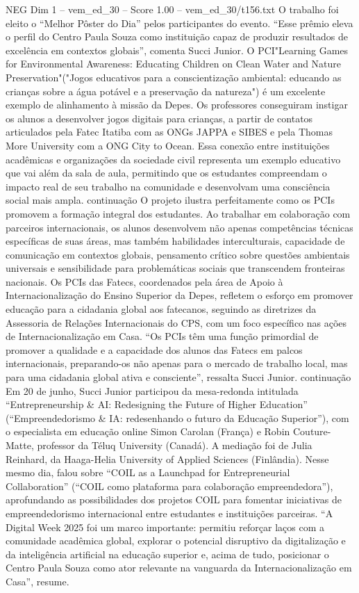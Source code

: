 \begin{textsample}{NEG Dim 1 – vem\_ed\_30 – Score 1.00 – vem\_ed\_30/t156.txt}
O trabalho foi eleito o “Melhor Pôster do Dia” pelos participantes do evento. “Esse prêmio eleva o perfil do Centro Paula Souza como instituição capaz de produzir resultados de excelência em contextos globais”, comenta Succi Junior.
O PCI"Learning Games for Environmental Awareness: Educating Children on Clean Water and Nature Preservation"("Jogos educativos para a conscientização ambiental: educando as crianças sobre a água potável e a preservação da natureza") é um excelente exemplo de alinhamento à missão da Depes.
Os professores conseguiram instigar os alunos a desenvolver jogos digitais para crianças, a partir de contatos articulados pela Fatec Itatiba com as ONGs JAPPA e SIBES e pela Thomas More University com a ONG City to Ocean.
Essa conexão entre instituições acadêmicas e organizações da sociedade civil representa um exemplo educativo que vai além da sala de aula, permitindo que os estudantes compreendam o impacto real de seu trabalho na comunidade e desenvolvam uma consciência social mais ampla. continuação O projeto ilustra perfeitamente como os PCIs promovem a formação integral dos estudantes.
Ao trabalhar em colaboração com parceiros internacionais, os alunos desenvolvem não apenas competências técnicas específicas de suas áreas, mas também habilidades interculturais, capacidade de comunicação em contextos globais, pensamento crítico sobre questões ambientais universais e sensibilidade para problemáticas sociais que transcendem fronteiras nacionais.
Os PCIs das Fatecs, coordenados pela área de Apoio à Internacionalização do Ensino Superior da Depes, refletem o esforço em promover educação para a cidadania global aos fatecanos, seguindo as diretrizes da Assessoria de Relações Internacionais do CPS, com um foco específico nas ações de Internacionalização em Casa. “Os PCIs têm uma função primordial de promover a qualidade e a capacidade dos alunos das Fatecs em palcos internacionais, preparando-os não apenas para o mercado de trabalho local, mas para uma cidadania global ativa e consciente”, ressalta Succi Junior. continuação Em 20 de junho, Succi Junior participou da mesa-redonda intitulada “Entrepreneurship \& AI: Redesigning the Future of Higher Education” (“Empreendedorismo \& IA: redesenhando o futuro da Educação Superior”), com o especialista em educação online Simon Carolan (França) e Robin Couture-Matte, professor da Téluq University (Canadá).
A mediação foi de Julia Reinhard, da Haaga-Helia University of Applied Sciences (Finlândia).
Nesse mesmo dia, falou sobre “COIL as a Launchpad for Entrepreneurial Collaboration” (“COIL como plataforma para colaboração empreendedora”), aprofundando as possibilidades dos projetos COIL para fomentar iniciativas de empreendedorismo internacional entre estudantes e instituições parceiras. “A Digital Week 2025 foi um marco importante: permitiu reforçar laços com a comunidade acadêmica global, explorar o potencial disruptivo da digitalização e da inteligência artificial na educação superior e, acima de tudo, posicionar o Centro Paula Souza como ator relevante na vanguarda da Internacionalização em Casa”, resume.

\end{textsample}
